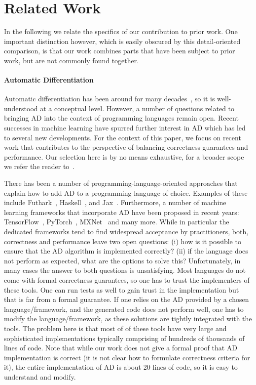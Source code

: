 \section{Related Work\label{sec:relatedwork}}

In the following we relate the specifics of our contribution to prior
work. One important distinction however, which is easily obscured by
this detail-oriented comparison, is that our work combines parts that
have been subject to prior work, but are not commonly found together.

\paragraph{Automatic Differentiation}

Automatic differentiation has been around for many decades~\cite{early-ad1, early-ad2},
so it is well-understood at a conceptual level.  However,
a number of questions related to bringing AD into the context of
programming languages remain open.  Recent successes in machine learning
have spurred further interest in AD which has led to several new developments.
For the context of this paper, we focus on recent work that contributes to 
the perspective of balancing correctness guarantees and performance.
Our selection here is by no means exhaustive, for
a broader scope we refer the reader to~\cite{autodiff-survey}.

There has been a number of programming-language-oriented approaches that explain
how to add AD to a programming language of choice. Examples of these include
Futhark~\cite{futhark/sc22ad}, Haskell~\cite{ad-haskell}, and
Jax~\cite{ad-jax,radul2023you}. Furthermore, a number of machine learning
frameworks that incorporate AD have been proposed in recent years: TensorFlow~\cite{ad-tf},
PyTorch~\cite{ad-pytorch}, MXNet~\cite{ad-mxnet} and many more.
While in particular the dedicated frameworks tend to find widespread 
acceptance by practitioners, both, correctness and performance leave
two open questions: (i) how is it possible to
ensure that the AD algorithm is implemented correctly?
(ii) if the
language does not perform as expected, what are the
options to solve this?  Unfortunately, in many cases the answer to
both questions is unsatisfying.  Most languages do not
come with formal correctness guarantees, so one has to trust the
implementers of these tools.  One can run tests as well to gain trust 
in the implementation but that is far from a 
formal guarantee.  If one relies
on the AD provided by a chosen language/framework, and the generated code does not
perform well, one has to modify the language/framework, as these solutions
are tightly integrated with the tools. The problem here is that most of of these tools
have very large and sophisticated implementations typically comprising
of hundreds of thousands of lines of code.  Note that while our work
does not give a formal proof that AD implementation is correct (it is
not clear how to formulate correctness criteria for it), the entire
implementation of AD is about 20 lines of code, so it is easy to
understand and modify.


